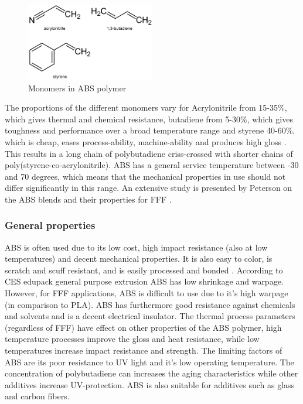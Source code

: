\begin{figure}[htb]
    \centering
    \includegraphics[width=0.5\textwidth]{chapter_2/figures/ABSformula.PNG}
    \caption{Monomers in ABS polymer}
    \label{fig:ABSforumla}
\end{figure}
The proportions of the different monomers vary for Acrylonitrile from 15-35\%, which gives thermal and chemical resistance,  butadiene from 5-30\%, which gives toughness and performance over a broad temperature range and styrene 40-60\%, which is cheap, eases process-ability, machine-ability and produces high gloss \cite{GrantaDesignLimited2018CESEdupack}. This results in a long chain of polybutadiene criss-crossed with shorter chains of poly(styrene-co-acrylonitrile). ABS has a general service temperature between -30 and 70 degrees, which means that the mechanical properties in use should not differ significantly in this range. An extensive study is presented by Peterson on the ABS blends and their properties for FFF \cite{Peterson2019ReviewPerspective}.

\subsubsection{General properties}
ABS is often used due to its low cost, high impact resistance (also at low temperatures) and decent mechanical properties. It is also easy to color, is scratch and scuff resistant, and is easily processed and bonded \cite{GrantaDesignLimited2018CESEdupack}. According to CES edupack \cite{GrantaDesignLimited2018CESEdupack} general purpose extrusion ABS has low shrinkage and warpage. However, for FFF applications, ABS is difficult to use due to it's high warpage (in comparison to PLA). ABS has furthermore good resistance against chemicals and  solvents and is a decent electrical insulator. The thermal process parameters (regardless of FFF) have  effect on other properties of the ABS polymer, high temperature processes improve the gloss and heat resistance, while low temperatures increase impact resistance and strength. 
The limiting factors of ABS are its poor resistance to UV light and it's low operating temperature. The concentration of polybutadiene can increases the aging characteristics while other additives increase UV-protection. ABS is also suitable for additives such as glass and carbon fibers. 

